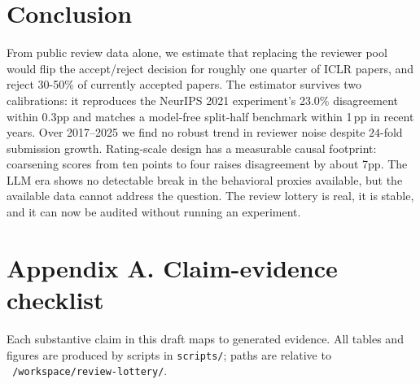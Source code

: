 \documentclass[10pt]{article}
\begin{document}
\section{Conclusion}

From public review data alone, we estimate that replacing the reviewer pool would flip the accept/reject decision for roughly one quarter of ICLR papers, and reject 30-50\% of currently accepted papers. The estimator survives two calibrations: it reproduces the NeurIPS 2021 experiment's 23.0\% disagreement within 0.3pp and matches a model-free split-half benchmark within 1\,pp in recent years. Over 2017--2025 we find no robust trend in reviewer noise despite $24$-fold submission growth. Rating-scale design has a measurable causal footprint: coarsening scores from ten points to four raises disagreement by about 7pp. The LLM era shows no detectable break in the behavioral proxies available, but the available data cannot address the question. The review lottery is real, it is stable, and it can now be audited without running an experiment.

\section{Appendix A. Claim-evidence checklist}

Each substantive claim in this draft maps to generated evidence. All tables and figures are produced by scripts in \texttt{scripts/}; paths are relative to \texttt{~/workspace/review-lottery/}.
\end{document}
